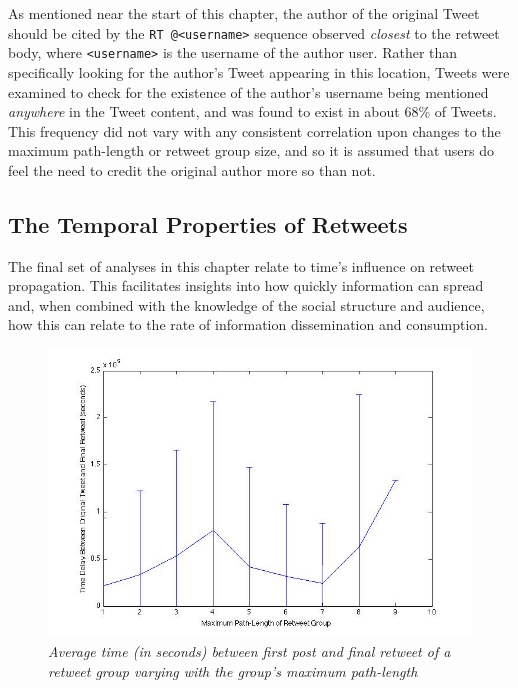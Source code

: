 As mentioned near the start of this chapter, the author of the original Tweet should be cited by the \texttt{RT @<username>} sequence observed \textit{closest} to the retweet body, where \texttt{<username>} is the username of the author user. Rather than specifically looking for the author's Tweet appearing in this location, Tweets were examined to check for the existence of the author's username being mentioned \textit{anywhere} in the Tweet content, and was found to exist in about 68\% of Tweets.\\
This frequency did not vary with any consistent correlation upon changes to the maximum path-length or retweet group size, and so it is assumed that users do feel the need to credit the original author more so than not. 

 
\subsection{The Temporal Properties of Retweets}
The final set of analyses in this chapter relate to time's influence on retweet propagation. This facilitates insights into how quickly information can spread and, when combined with the knowledge of the social structure and audience, how this can relate to the rate of information dissemination and consumption.

\begin{figure}[h]
\centering
\includegraphics[scale=0.35]{3.Chapter1/Media/pathlength-timedelay.jpg} 
\caption{\textit{Average time (in seconds) between first post and final retweet of a retweet group varying with the group's maximum path-length}}
\label{fig:timedelay-pathlength}
\end{figure}

